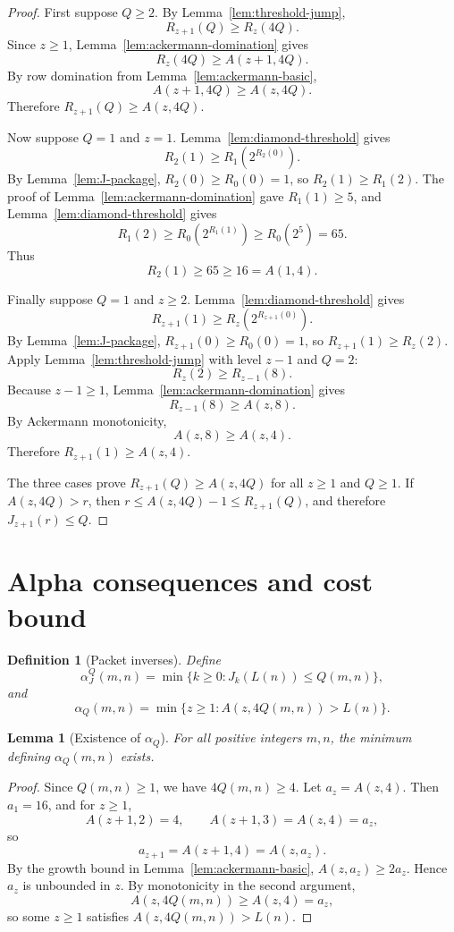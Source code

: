 ﻿\documentclass[11pt]{article}
\newtheorem{lemma}[theorem]{Lemma}
\newtheorem{definition}[theorem]{Definition}
\newcommand{\alphaQ}{\alpha_Q}
\newcommand{\alphaJQ}{\alpha_J^Q}
\begin{document}
\begin{proof}
First suppose $Q\ge2$.  By Lemma~\ref{lem:threshold-jump},
\[
R_{z+1}(Q)\ge R_z(4Q).
\]
Since $z\ge1$, Lemma~\ref{lem:ackermann-domination} gives
\[
R_z(4Q)\ge A(z+1,4Q).
\]
By row domination from Lemma~\ref{lem:ackermann-basic},
\[
A(z+1,4Q)\ge A(z,4Q).
\]
Therefore $R_{z+1}(Q)\ge A(z,4Q)$.

Now suppose $Q=1$ and $z=1$.  Lemma~\ref{lem:diamond-threshold} gives
\[
R_2(1)\ge R_1(2^{R_2(0)}).
\]
By Lemma~\ref{lem:J-package}, $R_2(0)\ge R_0(0)=1$, so $R_2(1)\ge R_1(2)$.  The proof of Lemma~\ref{lem:ackermann-domination} gave $R_1(1)\ge5$, and Lemma~\ref{lem:diamond-threshold} gives
\[
R_1(2)\ge R_0(2^{R_1(1)})\ge R_0(2^5)=65.
\]
Thus
\[
R_2(1)\ge65\ge16=A(1,4).
\]

Finally suppose $Q=1$ and $z\ge2$.  Lemma~\ref{lem:diamond-threshold} gives
\[
R_{z+1}(1)\ge R_z(2^{R_{z+1}(0)}).
\]
By Lemma~\ref{lem:J-package}, $R_{z+1}(0)\ge R_0(0)=1$, so $R_{z+1}(1)\ge R_z(2)$.  Apply Lemma~\ref{lem:threshold-jump} with level $z-1$ and $Q=2$:
\[
R_z(2)\ge R_{z-1}(8).
\]
Because $z-1\ge1$, Lemma~\ref{lem:ackermann-domination} gives
\[
R_{z-1}(8)\ge A(z,8).
\]
By Ackermann monotonicity,
\[
A(z,8)\ge A(z,4).
\]
Therefore $R_{z+1}(1)\ge A(z,4)$.

The three cases prove $R_{z+1}(Q)\ge A(z,4Q)$ for all $z\ge1$ and $Q\ge1$.  If $A(z,4Q)>r$, then $r\le A(z,4Q)-1\le R_{z+1}(Q)$, and therefore $J_{z+1}(r)\le Q$.
\end{proof}

\section{Alpha consequences and cost bound}

\begin{definition}[Packet inverses]
Define
\[
\alphaJQ(m,n)=\min\{k\ge0:J_k(L(n))\le Q(m,n)\},
\]
and
\[
\alphaQ(m,n)=\min\{z\ge1:A(z,4Q(m,n))>L(n)\}.
\]
\end{definition}

\begin{lemma}[Existence of $\alphaQ$]\label{lem:alphaQ-exists}
For all positive integers $m,n$, the minimum defining $\alphaQ(m,n)$ exists.
\end{lemma}

\begin{proof}
Since $Q(m,n)\ge1$, we have $4Q(m,n)\ge4$.  Let $a_z=A(z,4)$.  Then $a_1=16$, and for $z\ge1$,
\[
A(z+1,2)=4,
\qquad
A(z+1,3)=A(z,4)=a_z,
\]
so
\[
a_{z+1}=A(z+1,4)=A(z,a_z).
\]
By the growth bound in Lemma~\ref{lem:ackermann-basic}, $A(z,a_z)\ge2a_z$.  Hence $a_z$ is unbounded in $z$.  By monotonicity in the second argument,
\[
A(z,4Q(m,n))\ge A(z,4)=a_z,
\]
so some $z\ge1$ satisfies $A(z,4Q(m,n))>L(n)$.
\end{proof}
\end{document}
